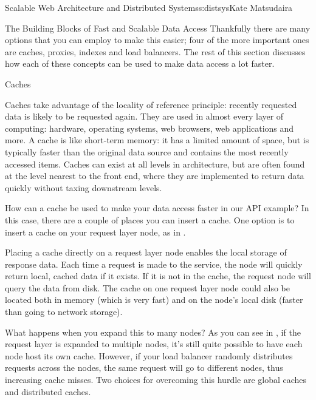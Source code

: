 \begin{aosachapter}{Scalable Web Architecture and Distributed Systems}{s:distsys}{Kate Matsudaira}
\begin{aosasect1}{The Building Blocks of Fast and Scalable Data Access}
Thankfully there are many options that you can employ to make this
easier; four of the more important ones are caches, proxies,
indexes and load balancers. The rest of this section 
discusses how each of these concepts can be used to make data
access a lot faster.

\begin{aosasect2}{Caches}

Caches take advantage of the locality of reference
principle: recently requested data is likely to be requested
again. They are used in almost every layer of computing:
hardware, operating systems, web browsers, web applications and
more. A cache is like short-term memory: it has a limited amount of
space, but is typically faster than the original data source and
contains the most recently accessed items. Caches can exist at all
levels in architecture, but are often found at the level nearest
to the front end, where they are implemented to return data
quickly without taxing downstream levels.

How can a cache be used to make your data access faster in our API example?  
In this case, there are a couple of places you can insert a cache.  One 
option is to insert a cache on your request layer node, as in
.


Placing a cache directly on a request layer node enables the local
storage of response data. Each time a request is made to the service,
the node will quickly return local, cached data if it exists. If it
is not in the cache, the request node will query the data from disk. The
cache on one request layer node could also be located both in memory
(which is very fast) and on the node's local disk (faster than going
to network storage).



What happens when you expand this to many nodes?
As you can see in , if the request layer is expanded to multiple nodes, it's still quite
possible to have each node host its own cache. However, if your load
balancer randomly distributes requests across the nodes, the same
request will go to different nodes, thus increasing cache misses. Two
choices for overcoming this hurdle are global caches and distributed
caches. 

\end{aosasect2}


\end{aosasect1}
\end{aosachapter}
